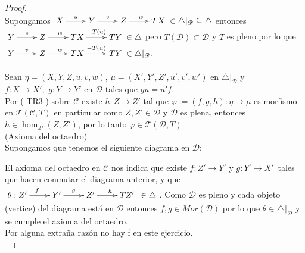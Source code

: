 \documentclass{article}
\begin{document}
\begin{enumerate}[label=\textbf{Ej \arabic*.}]
\begin{proof}
			\\
			Supongamos $\xymatrix{X\ar[r]^{u}&Y\ar[r]^{v}&Z\ar[r]^{w}&TX}\in \triangle|_{\mathscr{D}}\subseteq \triangle$ entonces \\
			$\xymatrix{Y\ar[r]^{v}&Z\ar[r]^{w}&TX\ar[r]^{-T(u)}&TY}\in \triangle$ pero $T(\mathscr{D})\subset \mathscr{D}$ y $T$ es pleno por lo que 
			$\xymatrix{Y\ar[r]^{v}&Z\ar[r]^{w}&TX\ar[r]^{-T(u)}&TY}\in \triangle|_{\mathscr{D}}$.\\
			
			\\
			Sean $\eta=(X,Y,Z,u,v,w)$, $\mu=(X',Y',Z',u',v',w')$ en $\triangle|_{\mathscr{D}}$ y\\$f:X\to X',\,\, g:Y\to Y'$ en $\mathscr{D}$ tales que $gu=u'f$.\\
			Por ( TR3 ) sobre $\mathscr{C}$ existe $h:Z\to Z'$ tal que $\varphi:=(f,g,h):\eta\to \mu$ es morfismo en $\mathscr{T}(\mathscr{C},T)$ en particular
			como $Z,Z'\in \mathscr{D}$ y $\mathscr{D}$ es plena, entonces $h\in \hom_{\mathscr{D}}(Z,Z')$, por lo tanto $\varphi\in \mathscr{T}(\mathscr{D},T)$.
			\\
			
			 (Axioma del octaedro)\\
			Supongamos que tenemos el siguiente diagrama en $\mathscr{D}$:\\
			\centerline{
			} 
			El axioma del octaedro en $\mathscr{C}$ nos indica que existe $f:Z'\to Y'$ y $g:Y'\to X'$ \,tales que hacen conmutar el diagrama anterior, y que\\
			$\xymatrix{\theta:Z'\ar[r]^f&Y'\ar[r]^g&Z'\ar[r]^{h\quad}&TZ' \,\,\, \in \triangle}$. Como $\mathscr{D}$ es pleno y cada objeto (vertice) 
			del diagrama está en 
			$\mathscr{D}$ entonces $f,g\in Mor(\mathscr{D})$ por lo que $\theta\in  \triangle|_{\mathscr{D}}$ y se cumple el axioma del octaedro.\\
			
			 Por alguna extraña razón no hay f en este ejercicio.\\
			

\end{proof}
\end{enumerate}
\end{document}
